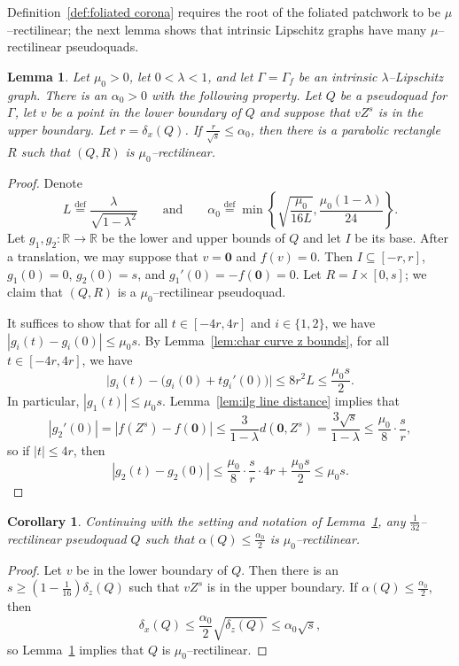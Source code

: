 \documentclass[11pt,reqno]{amsart}
\newcommand{\R}{\mathbb{R}}
\newcommand{\0}{\mathbf{0}}
\renewcommand{\1}{\mathbf 1}
\newcommand{\from}{\colon}
\renewcommand{\subset}{\subseteq}
\newcommand{\eqdef}{\stackrel{\mathrm{def}}{=}}
\renewcommand{\ge}{\geqslant}
\renewcommand{\le}{\leqslant}
\newtheorem{lemma}[thm]{Lemma}
\newtheorem{cor}[thm]{Corollary}
\theoremstyle{remark}
\begin{document}
Definition~\ref{def:foliated corona} requires the root of the foliated patchwork to be $\mu$--rectilinear; the next lemma shows that intrinsic Lipschitz graphs have many $\mu$--rectilinear pseudoquads.
\begin{lemma}\label{lem:small alpha rectilinear}
  Let $\mu_0>0$, let $0<\lambda<1$, and let $\Gamma=\Gamma_f$ be an intrinsic $\lambda$--Lipschitz graph.  There is an $\alpha_0>0$ with the following property.  Let $Q$ be a pseudoquad for $\Gamma$, let $v$ be a point in the lower boundary of $Q$ and suppose that $vZ^s$ is in the upper boundary.  Let $r=\delta_x(Q)$.  If $\frac{r}{\sqrt{s}} \le \alpha_0$, then there is a parabolic rectangle $R$ such that $(Q,R)$ is $\mu_0$--rectilinear.
\end{lemma}
\begin{proof}
Denote
  $$L\eqdef \frac{\lambda}{\sqrt{1-\lambda^2}}\qquad\mathrm{and}\qquad \alpha_0\eqdef \min\left\{ \sqrt{\frac{\mu_0}{16L}}, \frac{\mu_0 (1-\lambda)}{24}\right\}.$$
Let $g_1,g_2\from \R\to \R$ be the lower and upper bounds of $Q$ and let $I$ be its base.  After a translation, we may suppose that $v=\mathbf{0}$ and $f(v)=0$.  Then $I\subset [-r,r]$, $g_1(0)=0$, $g_2(0)=s$, and $g_1'(0)=-f(\mathbf{0})=0$.  Let $R=I\times [0,s]$; we claim that $(Q,R)$ is a $\mu_0$--rectilinear pseudoquad.

  It suffices to show that for all $t\in [-4r,4r]$ and $i\in \{1,2\}$, we have $|g_i(t)-g_i(0)|\le \mu_0 s$.  By Lemma~\ref{lem:char curve z bounds}, for all $t\in [-4r,4r]$, we have
  $$\big|g_i(t) - \big(g_i(0) + t g_i'(0)\big)\big|\le  8 r^2 L \le \frac{\mu_0 s}{2}.$$
  In particular, $|g_1(t)|\le \mu_0 s$. Lemma~\ref{lem:ilg line distance} implies that
  $$|g_2'(0)|=|f(Z^s)-f(\mathbf{0})|\le \frac{3}{1-\lambda} d(\mathbf{0}, Z^s) = \frac{3\sqrt{s}}{1-\lambda} \le \frac{\mu_0}{8}\cdot \frac{s}{r},$$
  so if $|t|\le 4r$, then
  \begin{equation*}\label{eq:small alpha small boundary variation}
    |g_2(t) - g_2(0)|\le \frac{\mu_0}{8}\cdot \frac{s}{r}\cdot  4r + \frac{\mu_0s }{2} \le \mu_0 s.\tag*{\qedhere}
  \end{equation*}
\end{proof}

\begin{cor}\label{cor:small alpha}
  Continuing with the setting and notation of Lemma~\ref{lem:small alpha rectilinear}, any $\frac{1}{32}$--rectilinear pseudoquad $Q$ such that $\alpha(Q)\le \frac{\alpha_0}{2}$ is $\mu_0$--rectilinear.
\end{cor}
\begin{proof}
  Let $v$ be in the lower boundary of $Q$.  Then there is an $s\ge (1-\frac{1}{16}) \delta_z(Q)$ such that $vZ^s$ is in the upper boundary.  If $\alpha(Q)\le \frac{\alpha_0}{2}$, then
  $$\delta_x(Q) \le \frac{\alpha_0}{2} \sqrt{\delta_z(Q)} \le \alpha_0\sqrt{s},$$
  so Lemma~\ref{lem:small alpha rectilinear} implies that $Q$ is $\mu_0$--rectilinear.
\end{proof}
\end{document}
